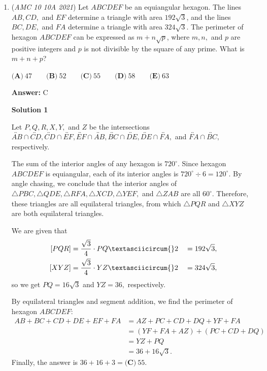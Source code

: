 \begin{enumerate}
 We now subtract these $88$ cases from $120$ to get our answer of $\boxed{32}$.

 


	\item (\textit{AMC 10 10A 2021}) Let $ABCDEF$ be an equiangular hexagon. The lines $AB, CD,$ and $EF$ determine a triangle with area $192\sqrt{3}$, and the lines $BC, DE,$ and $FA$ determine a triangle with area $324\sqrt{3}$. The perimeter of hexagon $ABCDEF$ can be expressed as $m +n\sqrt{p}$, where $m, n,$ and $p$ are positive integers and $p$ is not divisible by the square of any prime. What is $m + n + p$?


 $\textbf{(A)} ~47\qquad\textbf{(B)} ~52\qquad\textbf{(C)} ~55\qquad\textbf{(D)} ~58\qquad\textbf{(E)} ~63$

 \textbf{Answer: }C



\textbf{Solution 1}

Let $P,Q,R,X,Y,$ and $Z$ be the intersections $\overleftrightarrow{AB}\cap\overleftrightarrow{CD},\overleftrightarrow{CD}\cap\overleftrightarrow{EF},\overleftrightarrow{EF}\cap\overleftrightarrow{AB},\overleftrightarrow{BC}\cap\overleftrightarrow{DE},\overleftrightarrow{DE}\cap\overleftrightarrow{FA},$ and $\overleftrightarrow{FA}\cap\overleftrightarrow{BC},$ respectively.

 The sum of the interior angles of any hexagon is $720^\circ.$ Since hexagon $ABCDEF$ is equiangular, each of its interior angles is $720^\circ\div6=120^\circ.$ By angle chasing, we conclude that the interior angles of $\triangle PBC,\triangle QDE,\triangle RFA,\triangle XCD,\triangle YEF,$ and $\triangle ZAB$ are all $60^\circ.$ Therefore, these triangles are all equilateral triangles, from which $\triangle PQR$ and $\triangle XYZ$ are both equilateral triangles.

 We are given that
 \begin{alignat*}{8} [PQR]&=\frac{\sqrt{3}}{4}\cdot PQ\textasciicircum{}2&&=192\sqrt3, \\ [XYZ]&=\frac{\sqrt{3}}{4}\cdot YZ\textasciicircum{}2&&=324\sqrt3, \end{alignat*}so we get $PQ=16\sqrt3$ and $YZ=36,$ respectively.

 By equilateral triangles and segment addition, we find the perimeter of hexagon $ABCDEF:$
 \begin{align*} AB+BC+CD+DE+EF+FA&=AZ+PC+CD+DQ+YF+FA \\ &=(YF+FA+AZ)+(PC+CD+DQ) \\ &=YZ+PQ \\ &=36+16\sqrt{3}. \end{align*}
Finally, the answer is $36+16+3=\boxed{\textbf{(C)} ~55}.$





\end{enumerate}

